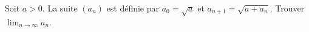 Soit $a > 0$. La suite $(a_n)$ est définie par $a_0 = \sqrt{a}$ et $a_{n+1} = \sqrt{a + a_n}$. Trouver $\lim_{n\to\infty} a_n$.
